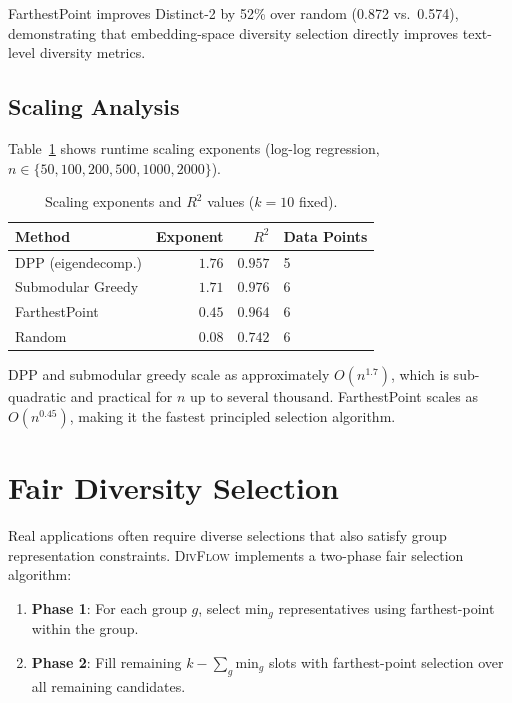 \documentclass[11pt]{article}
\begin{document}
FarthestPoint improves Distinct-2 by 52\% over random (0.872 vs.\ 0.574),
demonstrating that embedding-space diversity selection directly improves
text-level diversity metrics.

\subsection{Scaling Analysis}

Table~\ref{tab:scaling} shows runtime scaling exponents (log-log
regression, $n \in \{50, 100, 200, 500, 1000, 2000\}$).

\begin{table}[t]
\centering
\small
\caption{Scaling exponents and $R^2$ values ($k=10$ fixed).}
\label{tab:scaling}
\begin{tabular}{lrrl}
\toprule
Method & Exponent & $R^2$ & Data Points \\
\midrule
DPP (eigendecomp.)  & $1.76$ & $0.957$ & 5 \\
Submodular Greedy   & $1.71$ & $0.976$ & 6 \\
FarthestPoint       & $0.45$ & $0.964$ & 6 \\
Random              & $0.08$ & $0.742$ & 6 \\
\bottomrule
\end{tabular}
\end{table}

DPP and submodular greedy scale as approximately $O(n^{1.7})$, which
is sub-quadratic and practical for $n$ up to several thousand.
FarthestPoint scales as $O(n^{0.45})$, making it the fastest
principled selection algorithm.

\section{Fair Diversity Selection}
\label{sec:fair}

Real applications often require diverse selections that also satisfy
group representation constraints. \textsc{DivFlow} implements a
two-phase fair selection algorithm:

\begin{enumerate}
\item \textbf{Phase 1}: For each group $g$, select $\text{min}_g$ representatives
  using farthest-point within the group.
\item \textbf{Phase 2}: Fill remaining $k - \sum_g \text{min}_g$ slots
  with farthest-point selection over all remaining candidates.
\end{enumerate}
\end{document}
